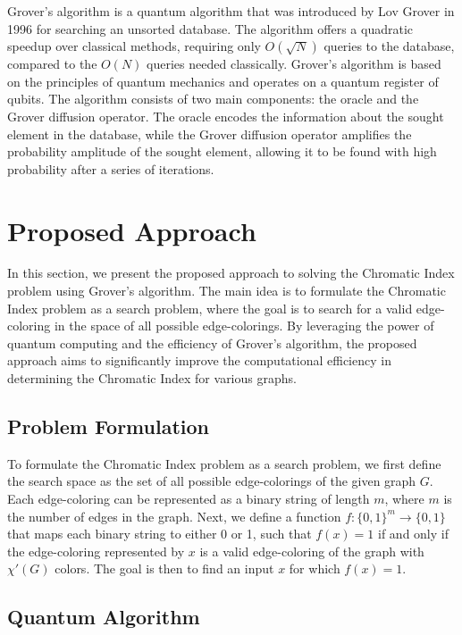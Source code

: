 Grover's algorithm is a quantum algorithm that was introduced by Lov Grover in 1996 for searching an unsorted database. The algorithm offers a quadratic speedup over classical methods, requiring only $O(\sqrt{N})$ queries to the database, compared to the $O(N)$ queries needed classically. Grover's algorithm is based on the principles of quantum mechanics and operates on a quantum register of qubits. The algorithm consists of two main components: the oracle and the Grover diffusion operator. The oracle encodes the information about the sought element in the database, while the Grover diffusion operator amplifies the probability amplitude of the sought element, allowing it to be found with high probability after a series of iterations.

\section{Proposed Approach}

In this section, we present the proposed approach to solving the Chromatic Index problem using Grover's algorithm. The main idea is to formulate the Chromatic Index problem as a search problem, where the goal is to search for a valid edge-coloring in the space of all possible edge-colorings. By leveraging the power of quantum computing and the efficiency of Grover's algorithm, the proposed approach aims to significantly improve the computational efficiency in determining the Chromatic Index for various graphs.

\subsection{Problem Formulation}

To formulate the Chromatic Index problem as a search problem, we first define the search space as the set of all possible edge-colorings of the given graph $G$. Each edge-coloring can be represented as a binary string of length $m$, where $m$ is the number of edges in the graph. Next, we define a function $f: \{0, 1\}^m \rightarrow \{0, 1\}$ that maps each binary string to either 0 or 1, such that $f(x) = 1$ if and only if the edge-coloring represented by $x$ is a valid edge-coloring of the graph with $\chi'(G)$ colors. The goal is then to find an input $x$ for which $f(x) = 1$.

\subsection{Quantum Algorithm}

